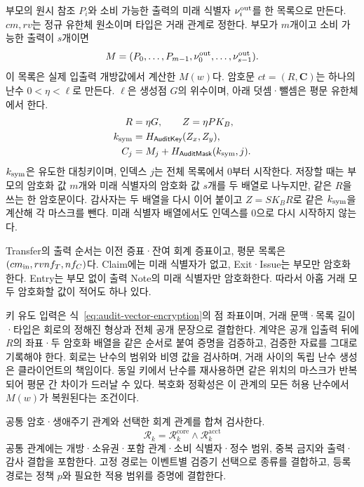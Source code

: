 부모의 원시 참조 $P_i$와 소비 가능한 출력의 미래
식별자 $\nu_i^{\rm out}$를 한 목록으로 만든다.
$cm,rv$는 정규 유한체 원소이며 타입은 거래 관계로 정한다.
부모가 $m$개이고 소비 가능한 출력이 $s$개이면
\begin{equation}
 M=(P_0,\ldots,P_{m-1},\nu_0^{\rm out},\ldots,\nu_{s-1}^{\rm out}).
 \label{eq:audit-vector}
\end{equation}
이 목록은 실제 입출력 개방값에서 계산한 $M(w)$다.
암호문 $ct=(R,\boldsymbol C)$는 하나의 난수 $0<\eta<\ell$로 만든다.
$\ell$은 생성점 $G$의 위수이며, 아래 덧셈·뺄셈은 평문 유한체에서 한다.
\begin{equation}
 \begin{aligned}
 R&=\eta G,\qquad Z=\eta PK_B,\\
 k_{\rm sym}&=H_{\mathsf{AuditKey}}(Z_x,Z_y),\\
 C_j&=M_j+H_{\mathsf{AuditMask}}(k_{\rm sym},j).
 \end{aligned}
 \label{eq:audit-vector-encryption}
\end{equation}
$k_{\rm sym}$은 유도한 대칭키이며, 인덱스 $j$는 전체 목록에서
0부터 시작한다. 저장할 때는 부모의
암호화 값 $m$개와 미래 식별자의 암호화 값 $s$개를 두 배열로
나누지만, 같은 $R$을 쓰는 한 암호문이다. 감사자는 두 배열을 다시
이어 붙이고 $Z=SK_B R$로 같은 $k_{\rm sym}$을 계산해 각 마스크를 뺀다.
미래 식별자 배열에서도 인덱스를 0으로 다시 시작하지 않는다.

Transfer의 출력 순서는 이전 증표·잔여 회계 증표이고,
평문 목록은 $(cm_{\rm in},rvnf_T,nf_C)$다.
Claim에는 미래 식별자가 없고, Exit·Issue는 부모만 암호화한다.
Entry는 부모 없이 출력 Note의 미래 식별자만 암호화한다.
따라서 아홉 거래 모두 암호화할 값이 적어도 하나 있다.

키 유도 입력은 식~\eqref{eq:audit-vector-encryption}의 점 좌표이며,
거래 문맥·목록 길이·타입은 회로의 정해진 형상과 전체 공개 문장으로 결합한다.
계약은 공개 입출력 뒤에 $R$의 좌표·두 암호화 배열을 같은 순서로
붙여 증명을 검증하고, 검증한 자료를 그대로 기록해야 한다.
회로는 난수의 범위와 비영 값을 검사하며, 거래 사이의 독립 난수
생성은 클라이언트의 책임이다. 동일 키에서 난수를 재사용하면
같은 위치의 마스크가 반복되어 평문 간 차이가 드러날 수 있다.
복호화 정확성은 이 관계의 모든 허용 난수에서 $M(w)$가 복원된다는
조건이다.

공통 암호·생애주기 관계와 선택한 회계 관계를 합쳐 검사한다.
\begin{equation}
 \mathcal{R}_k=\mathcal{R}^{\mathrm{core}}_k
                  \land\mathcal{R}^{\mathrm{acct}}_k
 \label{eq:relation}
\end{equation}
공통 관계에는 개방·소유권·포함 관계·소비 식별자·정수 범위,
중복 금지와 출력·감사 결합을 포함한다.
고정 경로는 이벤트별 검증기 선택으로 종류를 결합하고,
등록 경로는 정책 $p$와 필요한 적용 범위를 증명에 결합한다.

